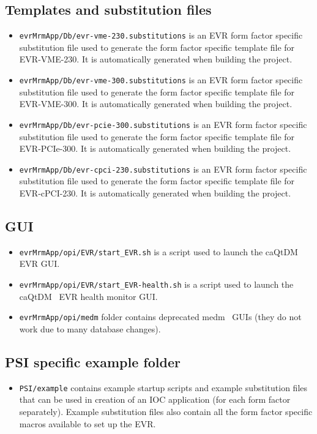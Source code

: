 \documentclass[12pt,a4paper]{article}
\begin{document}
\subsection{Templates and substitution files}\label{sec:mrfioc2 organization:templates}
\begin{itemize}
\item 
	\texttt{evrMrmApp/Db/evr-vme-230.substitutions} is an EVR form factor specific substitution file used to generate the form factor specific template file for EVR-VME-230. It is automatically generated when building the project.\label{itm:files:evr_ff_subs_vme}
\item 
	\texttt{evrMrmApp/Db/evr-vme-300.substitutions} is an EVR form factor specific substitution file used to generate the form factor specific template file for EVR-VME-300. It is automatically generated when building the project.\label{itm:files:evr_ff_subs_vme-300}
\item 
	\texttt{evrMrmApp/Db/evr-pcie-300.substitutions} is an EVR form factor specific substitution file used to generate the form factor specific template file for EVR-PCIe-300. It is automatically generated when building the project.\label{itm:files:evr_ff_subs_pcie}
\item 
	\texttt{evrMrmApp/Db/evr-cpci-230.substitutions} is an EVR form factor specific substitution file used to generate the form factor specific template file for EVR-cPCI-230. It is automatically generated when building the project.\label{itm:files:evr_ff_subs_cpci}
\end{itemize}

\subsection{GUI}\label{sec:mrfioc2 organization:gui}
\begin{itemize}
\item 
	\texttt{evrMrmApp/opi/EVR/start\_EVR.sh} is a script used to launch the caQtDM~\cite{caqtdm} EVR GUI. \label{itm:files:evr_gui}
\item 
	\texttt{evrMrmApp/opi/EVR/start\_EVR-health.sh} is a script used to launch the caQtDM~\cite{caqtdm} EVR health monitor GUI. \label{itm:files:evr_gui_health}
\item 
	\texttt{evrMrmApp/opi/medm} folder contains deprecated medm~\cite{medm} GUIs (they do not work due to many database changes).
\end{itemize}

\subsection{PSI specific example folder}\label{sec:PSI specifics}
\begin{itemize}
\item 
	\texttt{PSI/example} contains example startup scripts and example substitution files that can be used in creation of an IOC application (for each form factor separately). Example substitution files also contain all the form factor specific macros available to set up the EVR.
\end{itemize}
\end{document}
